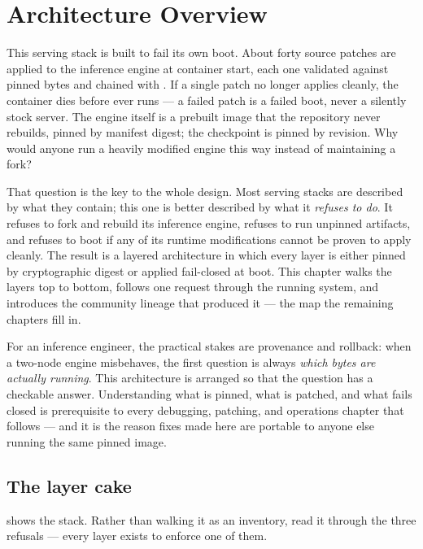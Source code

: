 \chapter{Architecture Overview}
\label{ch:architecture}

This serving stack is built to fail its own boot. About forty source
patches are applied to the inference engine at container start, each one
validated against pinned bytes and chained with . If a
single patch no longer applies cleanly, the container dies before
 ever runs --- a failed patch is a failed boot, never a
silently stock server. The engine itself is a prebuilt image that the
repository never rebuilds, pinned by manifest digest; the checkpoint is
pinned by revision. Why would anyone run a heavily modified engine this way
instead of maintaining a fork?

That question is the key to the whole design. Most serving stacks are
described by what they contain; this one is better described by what it
\emph{refuses to do}. It refuses to fork and rebuild its inference engine,
refuses to run unpinned artifacts, and refuses to boot if any of its
runtime modifications cannot be proven to apply cleanly. The result is a
layered architecture in which every layer is either pinned by cryptographic
digest or applied fail-closed at boot. This chapter walks the layers top to
bottom, follows one request through the running system, and introduces the
community lineage that produced it --- the map the remaining chapters fill
in.

For an inference engineer, the practical stakes are provenance and
rollback: when a two-node engine misbehaves, the first question is always
\emph{which bytes are actually running}. This architecture is arranged so
that the question has a checkable answer. Understanding what is pinned,
what is patched, and what fails closed is prerequisite to every debugging,
patching, and operations chapter that follows --- and it is the reason
fixes made here are portable to anyone else running the same pinned image.

\section{The layer cake}
\label{sec:architecture:layers}

 shows the stack. Rather than walking it as an
inventory, read it through the three refusals --- every layer exists to
enforce one of them.

